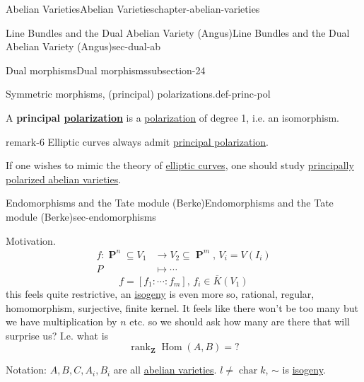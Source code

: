 \documentclass[oneside,10pt,]{book}
\newcommand{\terminology}[1]{\textbf{#1}}
\numberwithin{equation}{section}
\newcommand{\lb}{[}
\newcommand{\rb}{]}
\newcommand{\ZZ}{\mathbf{Z}}
\DeclareMathOperator{\Hom}{Hom}
\DeclareMathOperator{\rank}{rank}
\DeclareMathOperator{\characteristic}{char}
\DeclareMathOperator{\PP}{\mathbf{P}}
\newcommand{\amp}{&}
\begin{document}
\begin{chapterptx}{Abelian Varieties}{}{Abelian Varieties}{}{}{chapter-abelian-varieties}
\begin{sectionptx}{Line Bundles and the Dual Abelian Variety (Angus)}{}{Line Bundles and the Dual Abelian Variety (Angus)}{}{}{sec-dual-ab}
\begin{subsectionptx}{Dual morphisms}{}{Dual morphisms}{}{}{subsection-24}
\begin{definition}{Symmetric morphisms, (principal) polarizations.}{def-princ-pol}
\par
\hypertarget{p-204}{}%
A \terminology{principal \hyperref[def-c-pol]{polarization}} is a \hyperref[def-c-pol]{polarization} of degree 1, i.e. an isomorphism.%
\end{definition}
\begin{remark}{}{remark-6}%
\hypertarget{p-205}{}%
Elliptic curves always admit \hyperref[def-polarization]{principal polarization}.%
\par
\hypertarget{p-206}{}%
If one wishes to mimic the theory of \hyperref[def-supersing-isog-ec]{elliptic curves}, one should study \hyperref[def-princ-pol-av]{principally polarized abelian varieties}.%
\end{remark}
\end{subsectionptx}
\end{sectionptx}
%
%
\typeout{************************************************}
\typeout{************************************************}
%
\begin{sectionptx}{Endomorphisms and the Tate module (Berke)}{}{Endomorphisms and the Tate module (Berke)}{}{}{sec-endomorphisms}
\begin{introduction}{Motivation.}%
\hypertarget{p-207}{}%
%
\begin{align*}
f \colon \PP^n\subseteq V_1 \amp\to V_2 \subseteq \PP^m,\,V_i = V(I_i)\\
P\amp \mapsto \cdots
\end{align*}
%
\begin{equation*}
f = \lb f_1 : \cdots : f_m\rb ,\,f_i\in \overline K (V_1)
\end{equation*}
this feels quite restrictive, an \hyperref[def-supersing-isog-isog]{isogeny} is even more so, rational, regular, homomorphism, surjective, finite kernel. It feels like there won't be too many but we have multiplication by \(n\) etc. so we should ask how many are there that will surprise us? I.e. what is%
\begin{equation*}
\rank_\ZZ \Hom(A,B) = ?
\end{equation*}
%
\par
\hypertarget{p-208}{}%
Notation: \(A,B,C , A_i,  B_i\) are all \hyperref[def-buntes-abvar]{abelian varieties}. \(l \ne \characteristic k\), \(\sim\) is \hyperref[def-supersing-isog-isog]{isogeny}.%
\end{introduction}%
%
%
\typeout{************************************************}

\end{sectionptx}
\end{chapterptx}
\end{document}
